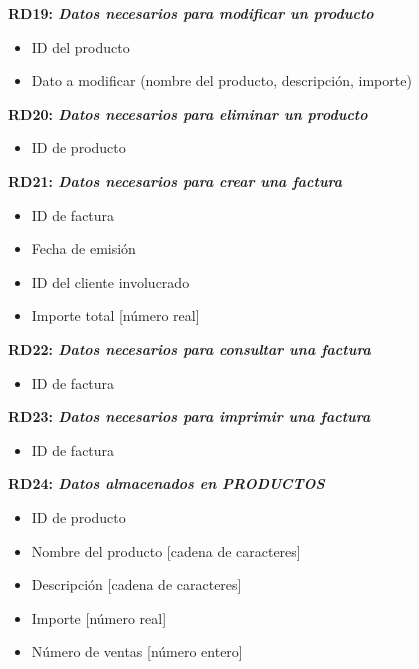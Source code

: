 \documentclass[paper=a4, fontsize=11pt, spanish]{scrartcl}
\begin{document}
	\setlength{\parindent}{0em}
	\textbf{RD19: \textit{Datos necesarios para modificar un producto}}
	\setlength{\parindent}{2em}
	\begin{itemize}
		\item ID del producto
		\item Dato a modificar (nombre del producto, descripción, importe)
	\end{itemize}

	\setlength{\parindent}{0em}
	\textbf{RD20: \textit{Datos necesarios para eliminar un producto}}
	\setlength{\parindent}{2em}
	\begin{itemize}
		\item ID de producto
	\end{itemize}

	\setlength{\parindent}{0em}
	\textbf{RD21: \textit{Datos necesarios para crear una factura}}
	\setlength{\parindent}{2em}
	\begin{itemize}
		\item ID de factura
		\item Fecha de emisión
		\item ID del cliente involucrado
		\item Importe total [número real]
	\end{itemize}

	\setlength{\parindent}{0em}
	\textbf{RD22: \textit{Datos necesarios para consultar una factura}}
	\setlength{\parindent}{2em}
	\begin{itemize}
		\item ID de factura
	\end{itemize}

	\setlength{\parindent}{0em}
	\textbf{RD23: \textit{Datos necesarios para imprimir una factura}}
	\setlength{\parindent}{2em}
	\begin{itemize}
		\item ID de factura
	\end{itemize}

	\setlength{\parindent}{0em}
	\textbf{RD24: \textit{Datos almacenados en PRODUCTOS}}
	\setlength{\parindent}{2em}
	\begin{itemize}
		\item ID de producto
		\item Nombre del producto [cadena de caracteres]
		\item Descripción [cadena de caracteres]
		\item Importe [número real]
		\item Número de ventas [número entero]
	\end{itemize}
\end{document}
